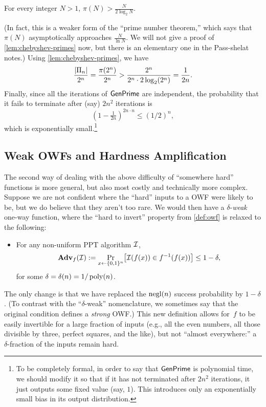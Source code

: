 \documentclass[11pt]{article}
\begin{document}
\begin{lemma}[Chebyshev]
  \label{lem:chebyshev-primes}
  For every integer $N > 1$, $\pi(N) > \frac{N}{2 \log_{2} N}$.
\end{lemma}
(In fact, this is a weaker form of the ``prime number theorem,'' which
says that $\pi(N)$ asymptotically approaches $\frac{N}{\ln N}$.  We
will not give a proof of \cref{lem:chebyshev-primes} now, but
there is an elementary one in the Pass-shelat notes.)  Using
\cref{lem:chebyshev-primes}, we have
\[ \frac{\lvert\Pi_{n}\rvert}{2^{n}} = \frac{\pi(2^{n})}{2^{n}} >
  \frac{2^{n}}{2^{n} \cdot 2 \log_{2}(2^{n})} = \frac{1}{2n}. \]
Finally, since all the iterations of $\mathsf{GenPrime}$ are
independent, the probability that it fails to terminate after (say)
$2n^{2}$ iterations is
\[ (1-\tfrac{1}{2n})^{2n \cdot n} \leq (1/2)^{n}, \] which is
exponentially small.\footnote{To be completely formal, in order to say
  that $\mathsf{GenPrime}$ is polynomial time, we should modify it so
  that if it has not terminated after $2n^{2}$ iterations, it just
  outputs some fixed value (say, $1$).  This introduces only an
  exponentially small bias in its output distribution.}

\subsection{Weak OWFs and Hardness Amplification}
\label{sec:hardn-ampl}

The second way of dealing with the above difficulty of ``somewhere
hard'' functions is more general, but also most costly and technically
more complex.  Suppose we are not confident where the ``hard'' inputs
to a OWF were likely to be, but we do believe that they aren't too
rare.  We would then have a $\delta$-\emph{weak} one-way function,
where the ``hard to invert'' property from \cref{def:owf} is
relaxed to the following:
\begin{itemize}
\item For any non-uniform PPT algorithm $\mathcal{I}$, \[ \advan_{f}(\Inv) :=
  \Pr_{x \gets \bit^{n}} \bracks*{\Inv(f(x)) \in f^{-1}(f(x))} \leq
  1-\delta, \] for some $\delta = \delta(n) = 1/\operatorname{poly}(n)$.
\end{itemize}
The only change is that we have replaced the $\operatorname{negl}(n)$ success
probability by $1-\delta$. (To contrast with the ``$\delta$-weak''
nomenclature, we sometimes say that the original condition defines a
\emph{strong} OWF.) This new definition allows for~$f$ to be easily
invertible for a large fraction of inputs (e.g., all the even numbers,
all those divisible by three, perfect squares, and the like), but not
``almost everywhere:'' a $\delta$-fraction of the inputs remain hard.
\end{document}
